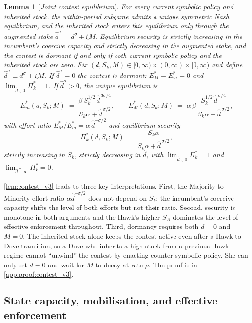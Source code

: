 \documentclass[11pt,twoside]{extarticle}
\newtheorem{lemma}{Lemma}
\begin{document}
\begin{lemma}[\emph{Joint contest equilibrium}]\label{lem:contest_v3}
\emph{For every current symbolic policy and inherited stock, the within-period subgame admits a unique symmetric Nash equilibrium, and the inherited stock enters this equilibrium only through the augmented stake $\hat d^\sigma= d^\sigma+\xi M$. Equilibrium security is strictly increasing in the incumbent's coercive capacity and strictly decreasing in the augmented stake, and the contest is dormant if and only if both current symbolic policy and the inherited stock are zero.}
Fix $(d,S_k,M)\in[0,\infty)\times(0,\infty)\times[0,\infty)$ and define $\hat d^\sigma\equiv d^\sigma+\xi M$. If $\hat d^\sigma=0$ the contest is dormant: $E_M^*=E_m^*=0$ and $\lim_{\hat d\downarrow 0}\Pi_k^*=1$. If $\hat d^\sigma>0$, the unique equilibrium is
\begin{equation}\label{eq:Em_Sk_explicit_v3}
    E_m^*(d,S_k;M)\;=\;\frac{\beta\,S_k^{1/2}\,\hat d^{\,3\sigma/4}}{S_k\alpha+\hat d^{\,\sigma/2}},
    \qquad
    E_M^*(d,S_k;M)\;=\;\alpha\,\beta\,\frac{S_k^{1/2}\,\hat d^{\,\sigma/4}}{S_k\alpha+\hat d^{\,\sigma/2}},
\end{equation}
with effort ratio $E_M^*/E_m^*=\alpha\,\hat d^{-\sigma/2}$ and equilibrium security
\begin{equation}\label{eq:Pi_v3}
    \Pi_k^*(d,S_k;M)\;=\;\frac{S_k\alpha}{S_k\alpha+\hat d^{\,\sigma/2}},
\end{equation}
strictly increasing in $S_k$, strictly decreasing in $\hat d$, with $\lim_{\hat d\downarrow 0}\Pi_k^*=1$ and $\lim_{\hat d\uparrow\infty}\Pi_k^*=0$.
\end{lemma}

\autoref{lem:contest_v3} leads to three key interpretations. First, the Majority-to-Minority effort ratio $\alpha\hat d^{-\sigma/2}$ does not depend on $S_k$: the incumbent's coercive capacity shifts the level of both efforts but not their ratio. Second, security is monotone in both arguments and the Hawk's higher $S_A$ dominates the level of effective enforcement throughout. Third, dormancy requires both $d=0$ and $M=0$. The inherited stock alone keeps the contest active even after a Hawk-to-Dove transition, so a Dove who inherits a high stock from a previous Hawk regime cannot ``unwind'' the contest by enacting counter-symbolic policy. She can only set $d=0$ and wait for $M$ to decay at rate $\rho$. The proof is in \autoref{app:proof:contest_v3}.

\subsection{State capacity, mobilisation, and effective enforcement}\label{subsec:Sk_v3}
\end{document}
